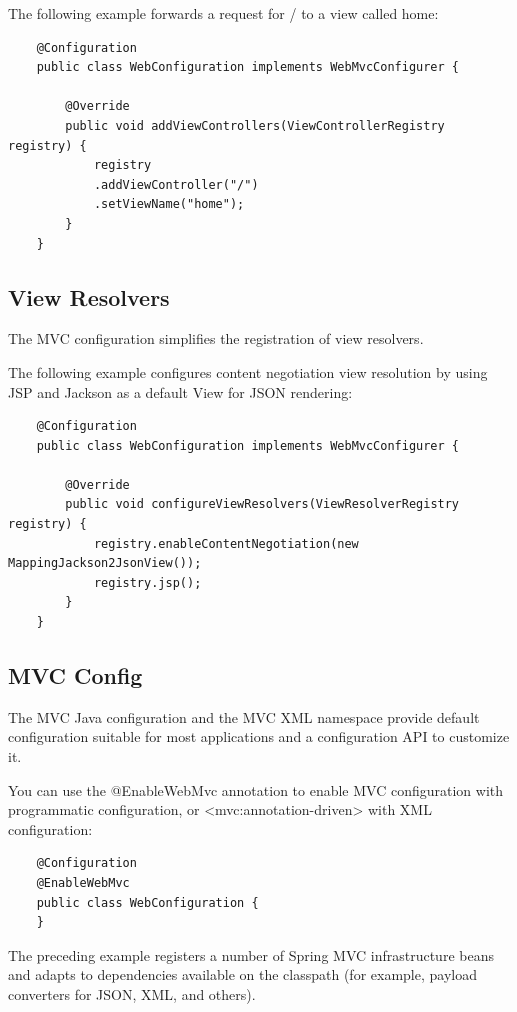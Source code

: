 \documentclass{scrartcl}
\begin{document}
The following example forwards a request for / to a view called home:

\begin{lstlisting}
    @Configuration
    public class WebConfiguration implements WebMvcConfigurer {

        @Override
        public void addViewControllers(ViewControllerRegistry registry) {
            registry
            .addViewController("/")
            .setViewName("home");
        }
    }
\end{lstlisting}

\subsection{View Resolvers}

The MVC configuration simplifies the registration of view resolvers.

The following example configures content negotiation view resolution by using JSP and Jackson as a default View for JSON rendering:

\begin{lstlisting}
    @Configuration
    public class WebConfiguration implements WebMvcConfigurer {

        @Override
        public void configureViewResolvers(ViewResolverRegistry registry) {
            registry.enableContentNegotiation(new MappingJackson2JsonView());
            registry.jsp();
        }
    }
\end{lstlisting}


\subsection{MVC Config}

The MVC Java configuration and the MVC XML namespace provide default configuration suitable for most applications and a configuration API to customize it.

You can use the @EnableWebMvc annotation to enable MVC configuration with programmatic configuration, or <mvc:annotation-driven> with XML configuration:

\begin{lstlisting}
    @Configuration
    @EnableWebMvc
    public class WebConfiguration {
    }
\end{lstlisting}

The preceding example registers a number of Spring MVC infrastructure beans and adapts to dependencies available on the classpath (for example, payload converters for JSON, XML, and others).
\end{document}

